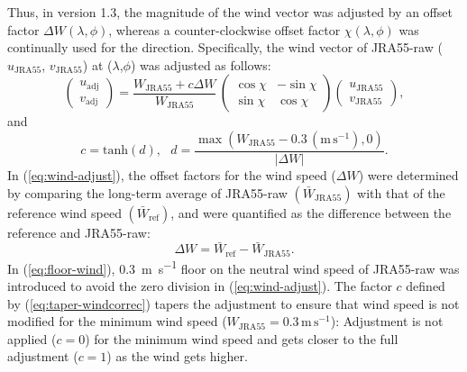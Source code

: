 \documentclass[dvipdfmx]{elsarticle_mod}
\begin{document}
Thus, in version 1.3, the magnitude of the wind vector was adjusted by an offset factor $\Delta W(\lambda,\phi)$, whereas a counter-clockwise offset factor $\chi(\lambda,\phi)$ was continually used for the direction. Specifically, the wind vector of JRA55-raw ($u_{\mathrm{JRA55}}$, $v_{\mathrm{JRA55}}$) at ($\lambda$,$\phi$) was adjusted as follows:
\begin{equation}
  \left(
    \begin{array}{c}
      u_{\mathrm{adj}} \\
      v_{\mathrm{adj}} 
    \end{array}
  \right)
  =
  \frac{W_{\mathrm{JRA55}} + c \Delta W}{W_{\mathrm{JRA55}}} \, \left(
    \begin{array}{rr}
      \cos \chi & -\sin \chi \\
      \sin \chi & \cos \chi
    \end{array}
  \right)
  \left(
    \begin{array}{c}
      u_{\mathrm{JRA55}} \\
      v_{\mathrm{JRA55}}
    \end{array}
  \right),
  \label{eq:wind-adjust}
\end{equation}
and
\begin{equation}
  c = \mathrm{tanh}(d),\,\,\,\, d = \frac{\max(W_{\mathrm{JRA55}} - 0.3\,(\mathrm{m}\,\mathrm{s}^{-1}),0)} {|\Delta W|}. \label{eq:taper-windcorrec}
\end{equation}
In (\ref{eq:wind-adjust}), the offset factors for the wind speed ($\Delta W$) were determined by comparing the long-term average of JRA55-raw $(\bar{W}_{\mathrm{JRA55}})$ with that of the reference wind speed $(\bar{W}_{\mathrm{ref}})$, and were quantified as the difference between the reference and JRA55-raw:
\begin{equation}
   \Delta W = \bar{W}_{\mathrm{ref}} - \bar{W}_{\mathrm{JRA55}}.
\end{equation}
In (\ref{eq:floor-wind}), \SI{0.3}{m.s^{-1}} floor on the neutral wind speed of JRA55-raw was introduced to avoid the zero division in (\ref{eq:wind-adjust}). The factor $c$ defined by (\ref{eq:taper-windcorrec}) tapers the adjustment to ensure that wind speed is not modified for the minimum wind speed ($W_\mathrm{JRA55}=0.3\,\mathrm{m}\,\mathrm{s}^{-1}$): Adjustment is not applied ($c=0$) for the minimum wind speed and gets closer to the full adjustment ($c=1$) as the wind gets higher.
\end{document}
